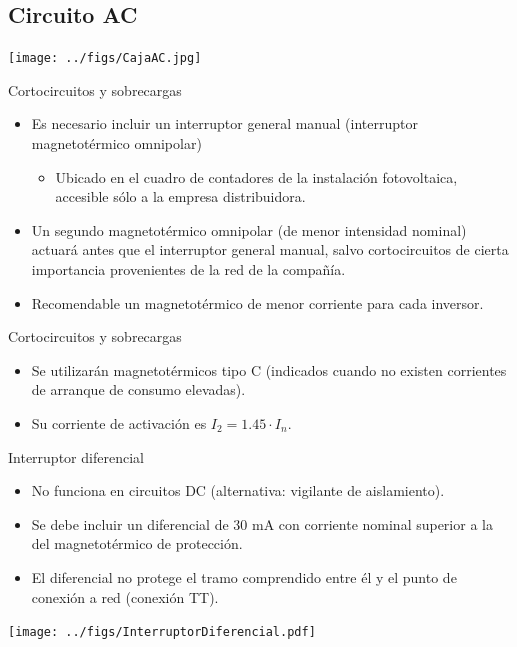 \documentclass[aspectratio=169, usenames,svgnames,dvipsnames]{beamer}
\begin{document}
\subsection{Circuito AC}
\label{sec:orgc851120}
\begin{frame}[label={sec:org9e4cd83}]{}
\begin{center}
\texttt{[image: ../figs/CajaAC.jpg]}
\end{center}
\end{frame}

\begin{frame}[label={sec:orgd032102}]{Cortocircuitos y sobrecargas}
\begin{itemize}
\item Es necesario incluir un \alert{interruptor general manual} (interruptor
magnetotérmico omnipolar)

\begin{itemize}
\item Ubicado en el cuadro de contadores de la instalación fotovoltaica,
\alert{accesible sólo a la empresa distribuidora}.
\end{itemize}

\item Un \alert{segundo magnetotérmico omnipolar} (de menor intensidad nominal)
actuará antes que el interruptor general manual, salvo
cortocircuitos de cierta importancia provenientes de la red de la
compañía.

\item Recomendable un magnetotérmico de menor corriente para cada
inversor.
\end{itemize}
\end{frame}

\begin{frame}[label={sec:org2ea61a6}]{Cortocircuitos y sobrecargas}
\begin{itemize}
\item Se utilizarán \alert{magnetotérmicos tipo C} (indicados cuando no existen corrientes de arranque de consumo elevadas).

\item Su corriente de activación es \(I_{2}=1.45\cdot I_{n}\).
\end{itemize}
\end{frame}

\begin{frame}[label={sec:org7389f35}]{Interruptor diferencial}
\begin{itemize}
\item \alert{No funciona en circuitos DC} (alternativa: vigilante de
aislamiento).

\item Se debe incluir un diferencial de 30 mA con corriente nominal
superior a la del magnetotérmico de protección.

\item El diferencial \alert{no protege el tramo comprendido entre él y el punto
de conexión a red} (conexión TT).
\end{itemize}
\begin{center}
\texttt{[image: ../figs/InterruptorDiferencial.pdf]}
\end{center}
\end{frame}
\end{document}
